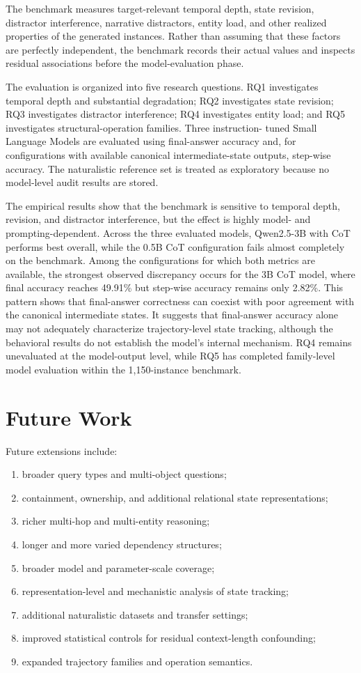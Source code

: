 \documentclass{iutbscthesis}
\begin{document}
The benchmark measures target-relevant temporal depth, state revision, distractor interference,
narrative distractors, entity load, and other realized properties of the generated instances. Rather
than assuming that these factors are perfectly independent, the benchmark records their actual values
and inspects residual associations before the model-evaluation phase.

The evaluation is organized into five research questions. RQ1 investigates temporal depth and
substantial degradation; RQ2 investigates state revision; RQ3 investigates distractor interference;
RQ4 investigates entity load; and RQ5 investigates structural-operation families. Three instruction-
tuned Small Language Models are evaluated using final-answer accuracy and, for configurations with
available canonical intermediate-state outputs, step-wise accuracy. The naturalistic reference set is
treated as exploratory because no model-level audit results are stored.

The empirical results show that the benchmark is sensitive to temporal depth, revision, and distractor
interference, but the effect is highly model- and prompting-dependent. Across the three evaluated models,
Qwen2.5-3B with CoT performs best overall, while the 0.5B CoT configuration fails almost completely on the
benchmark. Among the configurations for which both metrics are available, the strongest observed discrepancy
occurs for the 3B CoT model, where final accuracy reaches 49.91\% but step-wise accuracy remains only 2.82\%.
This pattern shows that final-answer correctness can coexist with poor agreement with the canonical
intermediate states. It suggests that final-answer accuracy alone may not adequately characterize
trajectory-level state tracking, although the behavioral results do not establish the model's internal
mechanism. RQ4 remains unevaluated at the model-output level, while RQ5 has completed family-level
model evaluation within the 1,150-instance benchmark.

\section{Future Work}
Future extensions include:
\begin{enumerate}
\item broader query types and multi-object questions;
\item containment, ownership, and additional relational state representations;
\item richer multi-hop and multi-entity reasoning;
\item longer and more varied dependency structures;
\item broader model and parameter-scale coverage;
\item representation-level and mechanistic analysis of state tracking;
\item additional naturalistic datasets and transfer settings;
\item improved statistical controls for residual context-length confounding;
\item expanded trajectory families and operation semantics.
\end{enumerate}
\end{document}
